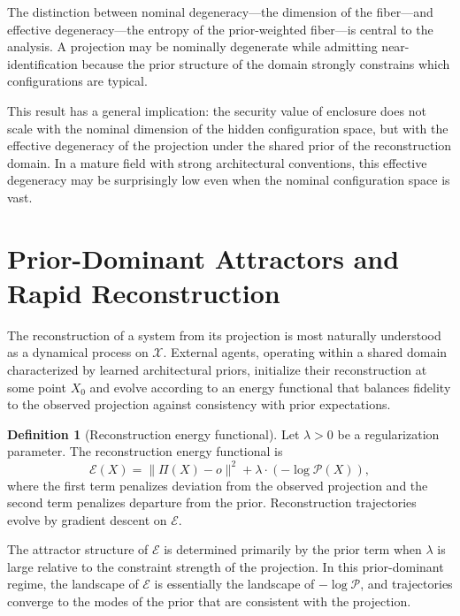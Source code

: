 \documentclass[12pt, oneside]{article}
\theoremstyle{plain}
\theoremstyle{definition}
\newtheorem{definition}[theorem]{Definition}
\theoremstyle{remark}
\newcommand{\proj}{\Pi}
\newcommand{\energy}{\mathcal{E}}
\newcommand{\config}{\mathcal{X}}
\newcommand{\prior}{\mathcal{P}}
\begin{document}
The distinction between nominal degeneracy---the dimension of the fiber---and effective
degeneracy---the entropy of the prior-weighted fiber---is central to the analysis. A
projection may be nominally degenerate while admitting near-identification because the
prior structure of the domain strongly constrains which configurations are typical.

This result has a general implication: the security value of enclosure does not scale with
the nominal dimension of the hidden configuration space, but with the effective degeneracy
of the projection under the shared prior of the reconstruction domain. In a mature field
with strong architectural conventions, this effective degeneracy may be surprisingly low
even when the nominal configuration space is vast.

\section{Prior-Dominant Attractors and Rapid Reconstruction}

The reconstruction of a system from its projection is most naturally understood as a
dynamical process on $\config$. External agents, operating within a shared domain
characterized by learned architectural priors, initialize their reconstruction at some
point $X_0$ and evolve according to an energy functional that balances fidelity to the
observed projection against consistency with prior expectations.

\begin{definition}[Reconstruction energy functional]
Let $\lambda > 0$ be a regularization parameter. The reconstruction energy functional is
\[
  \energy(X) = \| \proj(X) - o \|^2 + \lambda \cdot (-\log \prior(X)),
\]
where the first term penalizes deviation from the observed projection and the second term
penalizes departure from the prior. Reconstruction trajectories evolve by gradient descent
on $\energy$.
\end{definition}

The attractor structure of $\energy$ is determined primarily by the prior term when $\lambda$
is large relative to the constraint strength of the projection. In this prior-dominant
regime, the landscape of $\energy$ is essentially the landscape of $-\log \prior$, and
trajectories converge to the modes of the prior that are consistent with the projection.
\end{document}
